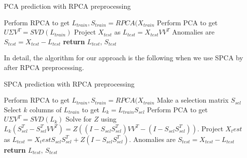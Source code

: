 \documentclass[conference]{IEEEtran}
\begin{document}
\begin{algorithm}
\caption{PCA prediction with RPCA preprocessing}\label{alg:pca and rpca prediction}
\begin{algorithmic}[1]
\State Perform RPCA to get $L_{train}, S_{train} = RPCA(X_{train}$
\State Perform PCA to get $U \Sigma V^T = SVD(L_{train})$
\State Project $X_{test}$ as $L_{test} = X_{test} V V^T$
\State Anomalies are $S_{test} = X_{test} - L_{test}$
\State \textbf{return} $L_{test}$, $S_{test}$
\EndProcedure
\end{algorithmic}
\end{algorithm}

In detail, the algorithm for our approach is the following when we use SPCA by after RPCA preprocessing. 

\begin{algorithm}
\caption{SPCA prediction with RPCA preprocessing}\label{alg:spca and rpca prediction}
\begin{algorithmic}[1]
\State Perform RPCA to get $L_{train}, S_{train} = RPCA(X_{train}$
\State Make a selection matrix $S_{sel}$
\State Select $k$ columns of $L_{train}$ to get $L_k = L_{train} S_{sel}$
\State Perform PCA to get $U \Sigma V^T = SVD(L_k)$
\State Solve for $Z$ using $L_k (S_{sel}^T - S_{sel}^T V V^T) = Z ((I-S_{sel} S_{sel}^T)V V^T - (I-S_{sel} S_{sel}^T))$.
\State Project $X_test$ as $L_{test} = X_test S_{sel} S_{sel}^T + Z (I-S_{sel} S_{sel}^T)$.
\State Anomalies are $S_{test} = X_{test} - L_{test}$
\State \textbf{return} $L_{test}$, $S_{test}$
\EndProcedure
\end{algorithmic}
\end{algorithm}
\end{document}
